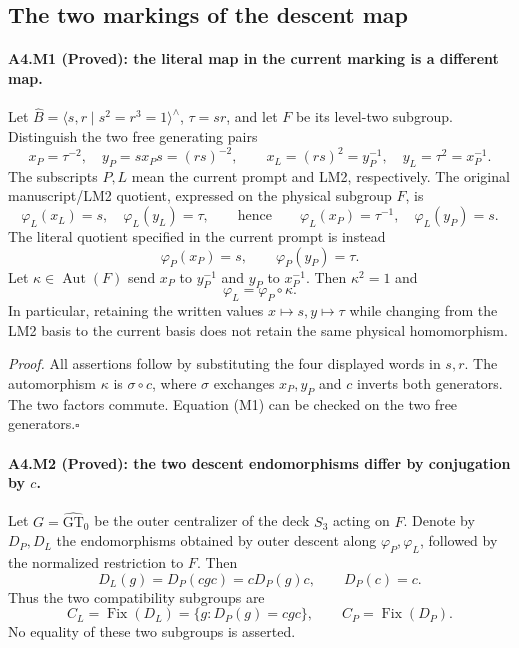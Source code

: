 \subsection{The two markings of the descent map}

\paragraph{A4.M1 (Proved): the literal map in the current marking is a different map.}
Let $\widehat B=\langle s,r\mid s^2=r^3=1\rangle^{\wedge}$,
$\tau=sr$, and let $F$ be its level-two subgroup.  Distinguish the
two free generating pairs
\[
 x_P=\tau^{-2},\quad y_P=sx_Ps=(rs)^{-2},\qquad
 x_L=(rs)^2=y_P^{-1},\quad y_L=\tau^2=x_P^{-1}.
\]
The subscripts $P,L$ mean the current prompt and LM2, respectively.
The original manuscript/LM2 quotient, expressed on the physical subgroup
$F$, is
\[
 \varphi_L(x_L)=s,\quad\varphi_L(y_L)=\tau,
 \qquad\text{hence}\qquad
 \varphi_L(x_P)=\tau^{-1},\quad\varphi_L(y_P)=s.
\]
The literal quotient specified in the current prompt is instead
\[
 \varphi_P(x_P)=s,\qquad\varphi_P(y_P)=\tau.
\]
Let $\kappa\in\operatorname{Aut}(F)$ send $x_P$ to $y_P^{-1}$ and
$y_P$ to $x_P^{-1}$. Then $\kappa^2=1$ and
\[
                 \varphi_L=\varphi_P\circ\kappa.                 \tag{M1}
\]
In particular, retaining the written values $x\mapsto s,y\mapsto\tau$
while changing from the LM2 basis to the current basis does not retain
the same physical homomorphism.

\emph{Proof.} All assertions follow by substituting the four displayed
words in $s,r$. The automorphism $\kappa$ is $\sigma\circ c$, where
$\sigma$ exchanges $x_P,y_P$ and $c$ inverts both generators.
The two factors commute.  Equation (M1) can be checked on the two
free generators.\hfill$\square$

\paragraph{A4.M2 (Proved): the two descent endomorphisms differ by conjugation by $c$.}
Let $G=\widehat{\mathrm{GT}}_0$ be the outer centralizer of the deck
$S_3$ acting on $F$. Denote by $D_P,D_L$ the endomorphisms obtained by
outer descent along $\varphi_P,\varphi_L$, followed by the normalized
restriction to $F$. Then
\[
 D_L(g)=D_P(cgc)=cD_P(g)c,\qquad
 D_P(c)=c.                                                       \tag{M2}
\]
Thus the two compatibility subgroups are
\[
 C_L=\operatorname{Fix}(D_L)
     =\{g:D_P(g)=cgc\},\qquad
 C_P=\operatorname{Fix}(D_P).
\]
No equality of these two subgroups is asserted.

